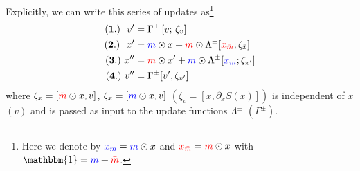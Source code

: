 \documentclass[a4paper,11pt]{article}
\newcommand{\mask}{\textcolor{blue}{{m}}}
\newcommand{\maskbar}{\textcolor{red}{\bar{m}}}
\newcommand{\xmask}{\textcolor{blue}{{x}_{m}}}
\newcommand{\xmaskbar}{\textcolor{red}{x_{\bar{m}}}}
\begin{document}
Explicitly, we can write this series of updates as\footnote{%
  Here we denote by \(\xmask = \mask \odot x\) and 
  \(\xmaskbar = \maskbar \odot x\) with \(\mathbbm{1} = \mask + \maskbar\).
}
%
\begin{align}
    \mathbf{(1.)}\,\,\,\, v' 
        &= \Gamma^{\pm}\left[v;\, \zeta_{v} \right] \\
    \mathbf{(2.)}\,\,\,\, x' 
        &= \mask \odot x + \maskbar \odot \Lambda^{\pm} [\xmaskbar; \zeta_{\bar{x}}] \\
    \mathbf{(3.)}\,\, x'' 
        &= \maskbar \odot x' + \mask \odot \Lambda^{\pm} [\xmask; \zeta_{x'}] \\
    \mathbf{(4.)}\,\, v'' 
        &= \Gamma^{\pm} [v', \zeta_{v'}]
\end{align}
%
where \(\zeta_{\bar{x}} = [\maskbar \odot x, v]\), \(\zeta_{x} = [\mask\odot x,
v]\) \((\zeta_{v} = [x, \partial_{x} S(x)])\) is independent of \(x\) \((v)\)
and is passed as input to the update functions \(\Lambda^{\pm}\)
\((\Gamma^{\pm})\).
%
\end{document}
